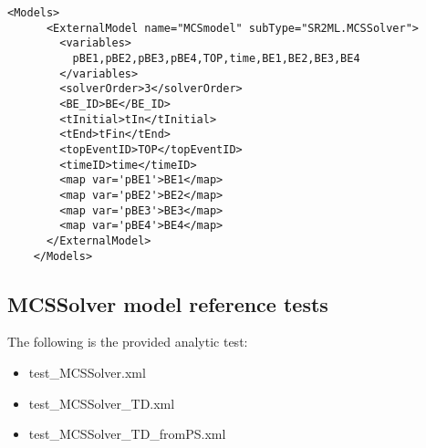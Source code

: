 \begin{itemize}
   \begin{lstlisting}[style=XML,morekeywords={anAttribute},caption=Time dependent (from PointSet) MCSSolver model input example., label=lst:MCSSolver_InputExample]
    <Models>
      <ExternalModel name="MCSmodel" subType="SR2ML.MCSSolver">
        <variables>
          pBE1,pBE2,pBE3,pBE4,TOP,time,BE1,BE2,BE3,BE4
        </variables>
        <solverOrder>3</solverOrder>
        <BE_ID>BE</BE_ID>
        <tInitial>tIn</tInitial>
        <tEnd>tFin</tEnd>
        <topEventID>TOP</topEventID>
        <timeID>time</timeID>
        <map var='pBE1'>BE1</map>
        <map var='pBE2'>BE2</map>
        <map var='pBE3'>BE3</map>
        <map var='pBE4'>BE4</map>
      </ExternalModel>
    </Models>
  \end{lstlisting}
\end{itemize}

\subsection{MCSSolver model reference tests}
The following is the provided analytic test:
\begin{itemize}
  \item test\_MCSSolver.xml
  \item test\_MCSSolver\_TD.xml
  \item test\_MCSSolver\_TD\_fromPS.xml
\end{itemize}




